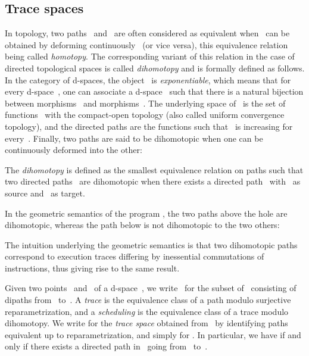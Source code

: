 \documentclass[orivec]{llncs} \usepackage[T1]{fontenc}
\begin{document}
\subsection{Trace spaces}
\label{tracespaces}
In topology, two paths~ and~ are often considered as equivalent when~
can be obtained by deforming continuously~ (or vice versa), this equivalence
relation being called \emph{homotopy}. The corresponding variant of this
relation in the case of directed topological spaces is called \emph{dihomotopy}
and is formally defined as follows. In the category of d-spaces, the
object~ is \emph{exponentiable}, which means that for every d-space~,
one can associate a d-space~ such that there is a natural bijection
between morphisms~ and morphisms~. The
underlying space of~ is the set of functions~ with the
compact-open topology (also called uniform convergence topology), and the
directed paths \hbox{} are the functions such that~ is increasing for every~. Finally, two paths are said to be
dihomotopic when one can be continuously deformed into the other:

\begin{definition}
  \label{def:dihomotopy}
  The \emph{dihomotopy} is defined as the smallest equivalence relation on paths
  such that two directed paths~ are dihomotopic when there exists
  a directed path~ with~ as source and~ as target.
\end{definition}

\begin{example}
  In the geometric semantics of the program ,
the two paths above the hole are dihomotopic, whereas the path below is not
  dihomotopic to the two others:
   
\end{example}

\noindent
The intuition underlying the geometric semantics is that two dihomotopic paths
correspond to execution traces differing by inessential commutations of
instructions, thus giving rise to the same result.

Given two points~ and~ of a d-space~, we write~ for the subset
of~ consisting of dipaths from~ to~. A \emph{trace} is the
equivalence class of a path modulo surjective reparametrization, and a
\emph{scheduling} is the equivalence class of a trace modulo dihomotopy. We write
 for the \emph{trace space} obtained from~ by
identifying paths equivalent up to reparametrization, and simply 
for . In particular, we have
 if and only if there exists a directed path
in~ going from~ to~.
\end{document}
